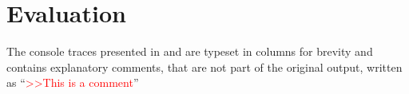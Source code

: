 \chapter{Evaluation}
\label{chap:evaluation}


\newcommand{\cmt}[1]{\textcolor{Red}{>>#1}}

The console traces presented in  and
 are typeset in columns for brevity and
contains explanatory comments, that are not part of the original output, written
as ``\cmt{This is a comment}''








